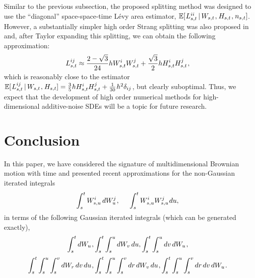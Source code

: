 \documentclass[sn-mathphys-num]{sn-jnl}%
\newcommand{\E}{\mathbb{E}}
\newcommand{\m}{\hspace{0.25mm}}
\begin{document}
Similar to the previous subsection, the proposed splitting method was designed to use the ``diagonal'' space-space-time L\'{e}vy area estimator, $\E[\m L_{s,t}^{ii}\,|\, W_{s,t}\m,\m H_{s,t}\m,\m n_{s,t}]$.
However, a substantially simpler high order Strang splitting was also proposed in \cite{foster2024splitting} and, after Taylor expanding this splitting, we can obtain the following approximation:\vspace{-1mm}
\begin{align}\label{eq:strang_approx_of_sst}
L_{s,t}^{ij} \approx \frac{2-\sqrt{3}}{24} h W_{s,t}^{i} W_{s,t}^{j} + \frac{\sqrt{3}}{2}h H_{s,t}^{i} H_{s,t}^{j}\m,\\[-20pt]\nonumber
\end{align}
which is reasonably close to the estimator $\m\E[\m L_{s,t}^{ij}\,|\, W_{s,t}\m,\m H_{s,t}] = \frac{3}{5}h H_{s,t}^i H_{s,t}^j + \frac{1}{30}\m h^2\delta_{ij}$,\vspace{0.5mm}
but clearly suboptimal. 
Thus, we expect that the development of high order numerical methods for high-dimensional additive-noise SDEs will be a topic for future research.

\section{Conclusion}\label{sect:conclusion}

In this paper, we have considered the signature of multidimensional Brownian motion with time and presented recent approximations for the non-Gaussian iterated integrals\vspace{-1mm}
\begin{align}\label{eq:conclude_integrals1}
\int_s^t W_{s,u}^i\, dW_u^j\m,\hspace{5mm}\int_s^t W_{s,u}^i W_{s,u}^j\m du,\\[-17pt]\nonumber
\end{align}
in terms of the following Gaussian iterated integrals (which can be generated exactly),\vspace{-1mm}
\begin{align}\label{eq:conclude_integrals2}
\int_s^t dW_u\m, &\int_s^t\int_s^u dW_v\, du, \int_s^t\int_s^u dv\, dW_u\m,\\[2pt] \int_s^t\int_s^u\int_s^v dW_r\, dv\, du\m, &\int_s^t\int_s^u\int_s^v dr\, dW_v\, du\m, \int_s^t\int_s^u\int_s^v dr\, dv\, dW_u\m.\nonumber\\[-17pt]\nonumber
\end{align}
\end{document}
